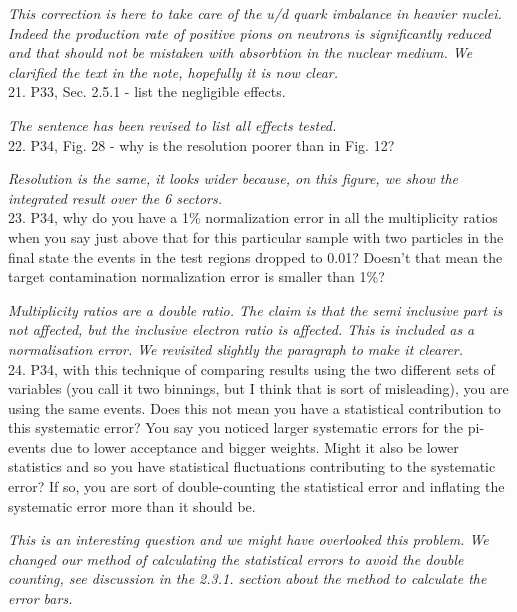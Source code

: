 \documentclass[12pt]{article}
\begin{document}
{\it This correction is here to take care of the u/d quark imbalance in heavier nuclei.
Indeed the production rate of positive pions on neutrons is significantly reduced and that
should not be mistaken with absorbtion in the nuclear medium. We clarified the text in the
note, hopefully it is now clear.} \\


21.
P33, Sec. 2.5.1 - list the negligible effects.

{\it The sentence has been revised to list all effects tested. } \\

22.
P34, Fig. 28 - why is the resolution poorer than in Fig. 12?

{\it Resolution is the same, it looks wider because, on this figure, we show the integrated 
result over the 6 sectors.} \\


23.
P34, why do you have a 1\% normalization error in all the multiplicity ratios when you say just 
above that for this particular sample with two particles in the final state the events in the test 
regions dropped to 0.01?  Doesn’t that mean the target contamination normalization error is 
smaller than 1\%?

{\it Multiplicity ratios are a double ratio. The claim is that the semi inclusive part 
is not affected, but the inclusive electron ratio is affected. This is included
as a normalisation error. We revisited slightly the paragraph to make it clearer.} \\


24.
P34, with this technique of comparing results using the two different sets of variables (you 
call it two binnings, but I think that is sort of misleading), you are using the same events.  
Does this not mean you have a statistical contribution to this systematic error?  You say you 
noticed larger systematic errors for the pi- events due to lower acceptance and bigger 
weights.  Might it also be lower statistics and so you have statistical fluctuations contributing 
to the systematic error?  If so, you are sort of double-counting the statistical error and 
inflating the systematic error more than it should be.  

{\it This is an interesting question and we might have overlooked this problem. We changed
our method of calculating the statistical errors to avoid the double counting, see
discussion in the 2.3.1. section about the method to calculate the error bars. } \\
\end{document}
